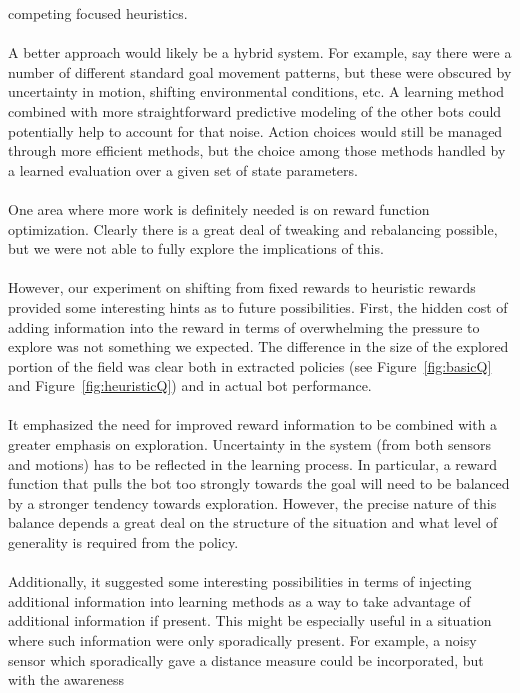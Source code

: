 \documentclass{aiaa-tc}%
\begin{document}
competing focused heuristics. \\ \\
A better approach would likely be a hybrid system. For example, say
there were a number of different standard goal movement patterns, but
these were obscured by uncertainty in motion, shifting environmental
conditions, etc. A learning method combined with more straightforward
predictive modeling of the other bots could potentially help to
account for that noise. Action choices would still be managed through
more efficient methods, but the choice among those methods handled by
a learned evaluation over a given set of state parameters. \\ \\
One area where more work is definitely needed is on reward function
optimization. Clearly there is a great deal of tweaking and rebalancing
possible, but we were not able to fully explore the implications of
this. \\ \\
However, our experiment on shifting from fixed rewards to
heuristic rewards provided some interesting hints as to future possibilities. First, the hidden cost of
adding information into the reward in terms of overwhelming the
pressure to explore was not something we expected. The difference in the size of the explored portion of the field was clear both in extracted policies (see Figure~\ref{fig:basicQ} and Figure~\ref{fig:heuristicQ}) and in actual bot performance. \\ \\
It
emphasized the need for improved reward information to be combined with a greater emphasis
on exploration. Uncertainty in the system (from both sensors and
motions) has to be reflected in the learning process. In particular, a reward function that pulls the bot too strongly towards the goal will need to be balanced by a stronger tendency towards exploration. However, the precise nature of this balance depends a great deal on the structure of the situation and what level of generality is required from the policy. \\ \\ 
Additionally, it
suggested some interesting possibilities in terms of injecting
additional information into learning methods as a way to take
advantage of additional information if present. This might be
especially useful in a situation where such information were only
sporadically present. For example, a noisy sensor which sporadically
gave a distance measure could be incorporated, but with the awareness
\end{document}
